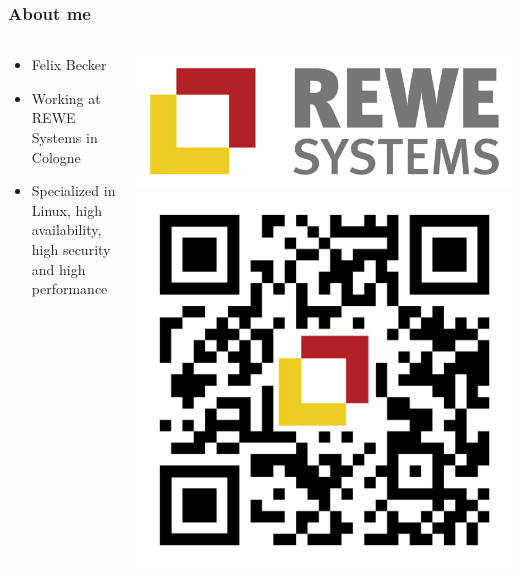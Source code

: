 \documentclass[aspectratio=169]{beamer}
\begin{document}
\begin{frame}
	\frametitle{About me}

\begin{columns}
    \begin{column}{0.48\textwidth}
		\begin{itemize}
		\item{Felix Becker}
		\item{Working at REWE Systems in Cologne}
		\item{Specialized in Linux, high availability, high security and high performance}
		\end{itemize}
    \end{column}
    \begin{column}{0.48\textwidth}
		\includegraphics[scale=0.2]{assets/rewesyslogo.jpg}
		\includegraphics[scale=0.1]{assets/qr-code.pdf}
    \end{column}
\end{columns}
\end{frame}
\end{document}
